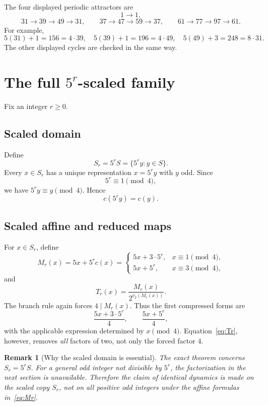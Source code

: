\documentclass[11pt]{article}
\newtheorem{remark}{Remark}
\newcommand{\vTwo}{\nu_2}
\begin{document}
The four displayed periodic attractors are
\[
1\to1,
\]
\[
31\to39\to49\to31,
\qquad
37\to47\to59\to37,
\qquad
61\to77\to97\to61.
\]
For example,
\[
5(31)+1=156=4\cdot39,\quad
5(39)+1=196=4\cdot49,\quad
5(49)+3=248=8\cdot31.
\]
The other displayed cycles are checked in the same way.

\section{The full $5^r$-scaled family}
Fix an integer $r\ge0$.

\subsection{Scaled domain}
Define
\begin{equation}
S_r=5^rS=\{5^r y:y\in S\}.
\label{eq:Sr}
\end{equation}
Every $x\in S_r$ has a unique representation $x=5^r y$ with $y$ odd. Since
\begin{equation}
5^r\equiv1\pmod4,
\label{eq:mod4}
\end{equation}
we have $5^r y\equiv y\pmod4$. Hence
\begin{equation}
c(5^r y)=c(y).
\label{eq:branchpres}
\end{equation}

\subsection{Scaled affine and reduced maps}
For $x\in S_r$, define
\begin{equation}
M_r(x)=5x+5^r c(x)
=\begin{cases}
5x+3\cdot5^r,&x\equiv1\pmod4,\\
5x+5^r,&x\equiv3\pmod4,
\end{cases}
\label{eq:Mr}
\end{equation}
and
\begin{equation}
T_r(x)=\frac{M_r(x)}{2^{\vTwo(M_r(x))}}.
\label{eq:Tr}
\end{equation}
The branch rule again forces $4\mid M_r(x)$. Thus the first compressed forms are
\begin{equation}
\frac{5x+3\cdot5^r}{4},\qquad \frac{5x+5^r}{4},
\label{eq:forced4}
\end{equation}
with the applicable expression determined by $x\pmod4$. Equation~\eqref{eq:Tr}, however, removes \emph{all} factors of two, not only the forced factor $4$.

\begin{remark}[Why the scaled domain is essential]
The exact theorem concerns $S_r=5^rS$. For a general odd integer not divisible by $5^r$, the factorization in the next section is unavailable. Therefore the claim of identical dynamics is made on the scaled copy $S_r$, not on all positive odd integers under the affine formulas in~\eqref{eq:Mr}.
\end{remark}
\end{document}
